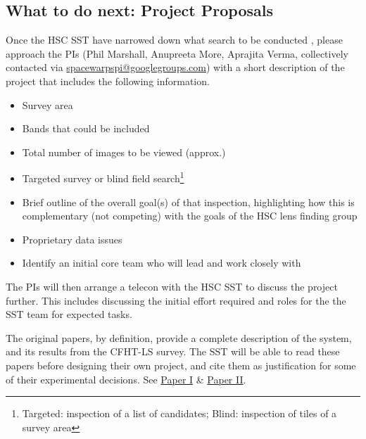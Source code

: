 \documentclass[a4paper,twocolumn]{article}
\begin{document}
\subsection{What to do next: Project Proposals}
Once the HSC SST have narrowed down what search to be conducted \SW,
please approach the \SW PIs (Phil Marshall, Anupreeta More, Aprajita
Verma, collectively contacted via
\href{mailto:spacewarpspi@googlegroups.com}{spacewarpspi@googlegroups.com})
with a short description of the project that includes the following
information.

\begin{itemize}
\item Survey area
\item Bands that could be included
\item Total number of images to be viewed (approx.)
\item Targeted survey or blind field search\footnote{Targeted: inspection of a list of candidates; Blind: inspection of tiles of a survey area}
\item Brief outline of the overall goal(s) of that inspection, highlighting how this is complementary (not competing) with the goals of the HSC lens finding group
\item Proprietary data issues 
\item Identify an initial core team who will lead and work closely with \SW
\end{itemize}


The \SW PIs will then arrange a telecon with the HSC SST to discuss
the project further. This includes discussing the initial effort
required and roles for the the SST team for expected tasks.


The original \SW papers, by definition, provide a complete description of the system, and its results from the CFHT-LS survey. The SST will be able
to read these papers before designing their own \SW project, and cite them as justification for some of their experimental decisions. 
See \href{https://github.com/drphilmarshall/SpaceWarps/raw/master/doc/sw-system-published.pdf}{Paper I} \& \href{https://github.com/drphilmarshall/SpaceWarps/raw/master/doc/sw-cfhtls-published.pdf}{Paper II}.
\end{document}
